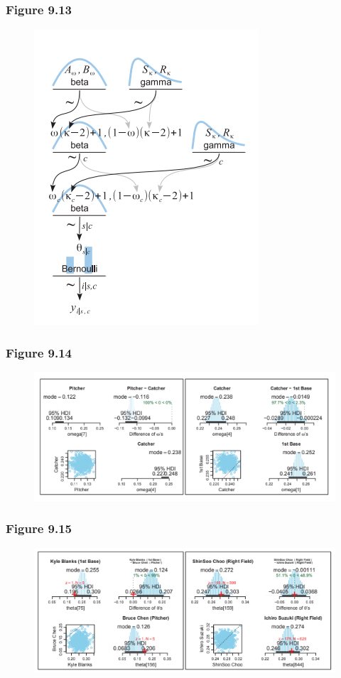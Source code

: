 \documentclass[usenames,dvipsnames,table]{beamer}
\begin{document}
\begin{frame}
\frametitle{Figure 9.13}
\begin{figure}
\centering
\includegraphics[height=0.8\textheight]{img/fig9_13}
\end{figure}

\end{frame}
\begin{frame}
\frametitle{Figure 9.14}
\begin{figure}
\centering
\includegraphics[width=\linewidth]{img/fig9_14}
\end{figure}
\end{frame}

\begin{frame}
\frametitle{Figure 9.15}
\begin{figure}
\centering
\includegraphics[width=\linewidth]{img/fig9_15}
\end{figure}
\end{frame}
\end{document}
